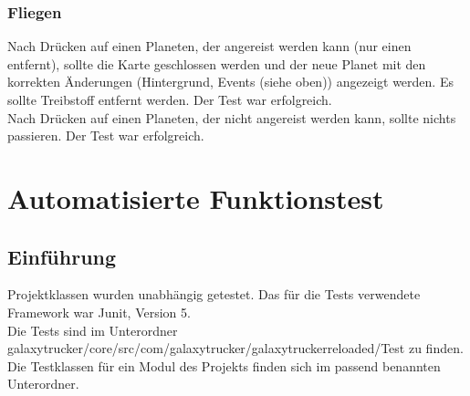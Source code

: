 \documentclass[fontsize=12pt,paper=a4,twoside]{scrartcl}
\begin{document}
\subsubsection{Fliegen}
Nach Drücken auf einen Planeten, der angereist werden kann (nur einen entfernt), sollte die Karte geschlossen werden und der neue Planet mit den korrekten Änderungen (Hintergrund, Events (siehe oben)) angezeigt werden. Es sollte Treibstoff entfernt werden.  Der Test war erfolgreich. \\
Nach Drücken auf einen Planeten, der nicht angereist werden kann, sollte nichts passieren.  Der Test war erfolgreich. \\

\section{Automatisierte Funktionstest}
\subsection{Einführung}
Projektklassen wurden unabhängig getestet. Das für die Tests verwendete Framework war Junit, Version 5. \\
Die Tests sind im Unterordner galaxytrucker/core/src/com/galaxytrucker/galaxytruckerreloaded/Test zu finden. Die Testklassen für ein Modul des Projekts finden sich im passend benannten Unterordner. \\
\end{document}

